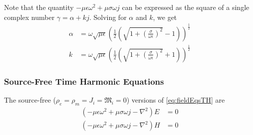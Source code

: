 \documentclass{article}
\numberwithin{equation}{section}
\begin{document}
            Note that the quantity $- \mu \epsilon \omega^2 + \mu \sigma \omega j $ can be
            expressed as the square of a single complex number $\gamma = \alpha + kj$.
            Solving for $\alpha$ and $k$, we get
            \begin{subequations}
            \begin{align} \label{eq:attenuationConstant}
                \alpha &= \omega \sqrt{\mu \epsilon} \left( \frac{1}{2} \left( \sqrt{1 +
                    \left( \frac{\sigma}{\omega \epsilon} \right)^2 } - 1 \right)
                    \right)^{\frac{1}{2}} \\
                k &= \omega \sqrt{\mu \epsilon} \left( \frac{1}{2} \left( \sqrt{1 + \left(
                    \frac{\sigma}{\omega \epsilon} \right)^2 } + 1 \right)
                    \right)^{\frac{1}{2}} \label{eq:wavenumber}
            \end{align}
            \end{subequations}
        \subsubsection{Source-Free Time Harmonic Equations}
            The source-free ($\rho_e = \rho_m = J_i = \mathfrak{M}_i = 0$) versions of
            \eqref{eq:fieldEqsTH} are
            \begin{subequations} \label{eq:fieldEqsSF}
                \begin{align}
                    (- \mu \epsilon \omega^2 + \mu \sigma \omega j - \nabla^2 ) E & = 0
                        \label{eq:electricFieldEqSF} \\
                    ( - \mu \epsilon \omega^2 + \mu \sigma \omega j - \nabla^2 ) H & = 0
                        \label{eq:magneticFieldEqSF}
                \end{align}
            \end{subequations}
\end{document}
